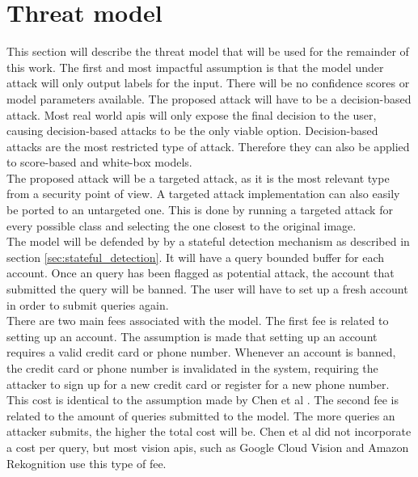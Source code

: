 \section{Threat model}\label{sec:threat_model}
This section will describe the threat model that will be used for the remainder of this work. The first and most impactful assumption is that the model under attack will only output labels for the input. There will be no confidence scores or model parameters available. The proposed attack will have to be a decision-based attack. Most real world \glspl{api} will only expose the final decision to the user, causing decision-based attacks to be the only viable option. Decision-based attacks are the most restricted type of attack. Therefore they can also be applied to score-based and white-box models.\\

The proposed attack will be a targeted attack, as it is the most relevant type from a security point of view. A targeted attack implementation can also easily be ported to an untargeted one. This is done by running a targeted attack for every possible class and selecting the one closest to the original image.\\

The model will be defended by by a stateful detection mechanism \cite{chen_stateful_2019} as described in section \ref{sec:stateful_detection}. It will have a query bounded buffer for each account. Once an query has been flagged as potential attack, the account that submitted the query will be banned. The user will have to set up a fresh account in order to submit queries again.\\

There are two main fees associated with the model. The first fee is related to setting up an account. The assumption is made that setting up an account requires a valid credit card or phone number. Whenever an account is banned, the credit card or phone number is invalidated in the system, requiring the attacker to sign up for a new credit card or register for a new phone number. This cost is identical to the assumption made by Chen et al \cite{chen_stateful_2019}. The second fee is related to the amount of queries submitted to the model. The more queries an attacker submits, the higher the total cost will be. Chen et al \cite{chen_stateful_2019} did not incorporate a cost per query, but most vision \glspl{api}, such as Google Cloud Vision \cite{google_pricing} and Amazon Rekognition \cite{amazon_pricing} use this type of fee.\\

